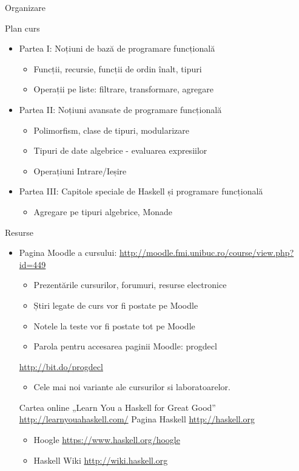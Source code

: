 \documentclass[xcolor=pdftex,romanian,colorlinks]{beamer}
\begin{document}
\begin{section}{Organizare}
\begin{frame}{Plan curs}
\begin{itemize}
\item Partea I: Noțiuni de bază de programare funcțională
\begin{itemize}
\item Funcții, recursie, funcții de ordin înalt, tipuri
\item Operații pe liste: filtrare, transformare, agregare
\end{itemize}
\item Partea II: Noțiuni avansate de programare funcțională
\begin{itemize}
\item Polimorfism, clase de tipuri, modularizare
\item Tipuri de date algebrice - evaluarea expresiilor
\item Operațiuni Intrare/Ieșire
\end{itemize}
\item Partea III: Capitole speciale de Haskell și programare funcțională
\begin{itemize}
\item Agregare pe tipuri algebrice, Monade
\end{itemize}
\end{itemize}
\end{frame}

\begin{frame}{Resurse}
\begin{itemize}
\item Pagina Moodle a cursului: \url{http://moodle.fmi.unibuc.ro/course/view.php?id=449}
\begin{itemize}
\item Prezentările cursurilor, forumuri, resurse electronice
\item Știri legate de curs vor fi postate pe Moodle
\item Notele la teste vor fi postate tot pe Moodle
\item Parola pentru accesarea paginii Moodle: progdecl
\end{itemize}
\vitem \url{http://bit.do/progdecl}
\begin{itemize}
\item Cele mai noi variante ale cursurilor si laboratoarelor.
\end{itemize}
\vitem Cartea online „Learn You a Haskell for Great Good” \url{http://learnyouahaskell.com/}
\vitem Pagina Haskell \url{http://haskell.org}
\begin{itemize}
\item Hoogle \url{https://www.haskell.org/hoogle}
\item Haskell Wiki \url{http://wiki.haskell.org}
\end{itemize}
\end{itemize}
\end{frame}



\end{section}
\end{document}
